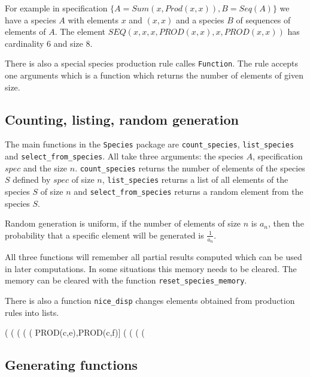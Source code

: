 \documentclass[11pt]{article}
\newcommand{\command}[1]{\texttt{#1}}
\begin{document}
For example in specification $\{A=Sum(x, Prod(x,x)), B=Seq(A)\}$ we
have a species $A$ with elements $x$ and $(x,x)$ and a species $B$ of
sequences of elements of $A$. The element $SEQ(x, x, x, PROD(x,x), x,
PROD(x,x))$ has cardinality 6 and size 8.

There is also a special species production rule calles \command{Function}.
The rule accepts one arguments which is a function which returns the
number of elements of given size.

\subsection{Counting, listing, random generation}

The main functions in the \command{Species} package are
\command{count\_species}, \command{list\_species} and
\command{select\_from\_species}. All take three arguments: the species
$A$, specification $spec$ and the size $n$.  \command{count\_species}
returns the number of elements of the species $S$ defined by $spec$ of
size $n$, \command{list\_species} returns a list of all elements of
the species $S$ of size $n$ and \command{select\_from\_species}
returns a random element from the species $S$.

Random generation is uniform, if the number of elements of size $n$ is
$a_n$, then the probability that a specific element will be generated
is $\frac{1}{a_n}$.

All three functions will remember all partial results computed which
can be used in later computations. In some situations this memory
needs to be cleared. The memory can be cleared with the function
\command{reset\_species\_memory}.

There is also a function \command{nice\_disp} changes elements
obtained from production rules into lists.

\begin{example}
(%
(%
(%
(%
(%
       PROD(c,e),PROD(c,f)]
(%
(%
(%
(%
\end{example}

\subsection{Generating functions}
\end{document}
